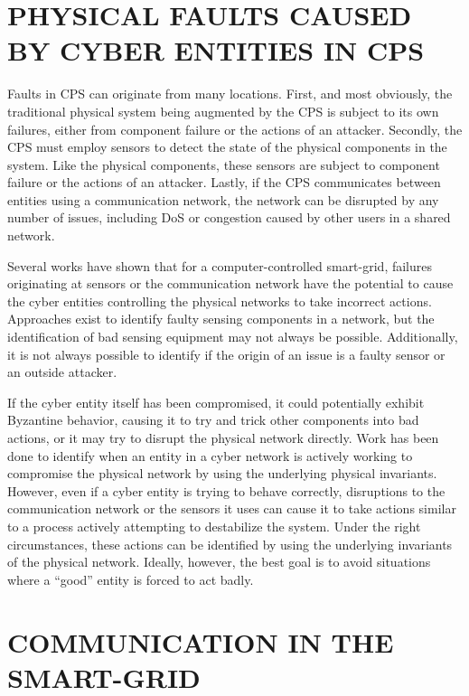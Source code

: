 \section{PHYSICAL FAULTS CAUSED BY CYBER ENTITIES IN CPS}

Faults in \ac{CPS} can originate from many locations.
First, and most obviously, the traditional physical system being augmented by the CPS is subject to its own failures, either from component failure or the actions of an attacker.
Secondly, the \ac{CPS} must employ sensors to detect the state of the physical components in the system.
Like the physical components, these sensors are subject to component failure or the actions of an attacker.
Lastly, if the \ac{CPS} communicates between entities using a communication network, the network can be disrupted by any number of issues, including DoS or congestion caused by other users in a shared network.

Several works have shown\cite{Roth2012}\cite{HARINI}\cite{CYBERRESEARCHCALL} that for a computer-controlled smart-grid, failures originating at sensors or the communication network have the potential to cause the cyber entities controlling the physical networks to take incorrect actions.
Approaches exist to identify faulty sensing components in a network, but the identification of bad sensing equipment may not always be possible.
Additionally, it is not always possible to identify if the origin of an issue is a faulty sensor or an outside attacker.

If the cyber entity itself has been compromised, it could potentially exhibit Byzantine behavior, causing it to try and trick other components into bad actions\cite{Roth2012}, or it may try to disrupt the physical network directly.
Work has been done to identify when an entity in a cyber network is actively working to compromise the physical network by using the underlying physical invariants.
However, even if a cyber entity is trying to behave correctly, disruptions to the communication network or the sensors it uses can cause it to take actions similar to a process actively attempting to destabilize the system.
Under the right circumstances, these actions can be identified by using the underlying invariants of the physical network.
Ideally, however, the best goal is to avoid situations where a ``good'' entity is forced to act badly.

\section{COMMUNICATION IN THE SMART-GRID}

